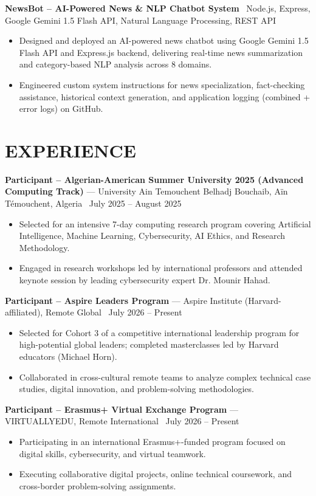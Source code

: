 \documentclass[10.5pt, letterpaper]{article}
\newcommand{\entry}[4]{%
  \noindent\textbf{#1} --- #3, #4 \textbar\ #2\par
  \vspace{2pt}
}
\newcommand{\projectentry}[2]{%
  \noindent\textbf{#1} \textbar\ #2\par
  \vspace{2pt}
}
\newcommand{\resumeItem}[1]{\item #1}
\begin{document}
\projectentry{NewsBot -- AI-Powered News \& NLP Chatbot System}{Node.js, Express, Google Gemini 1.5 Flash API, Natural Language Processing, REST API}
\begin{itemize}
  \resumeItem{Designed and deployed an AI-powered news chatbot using Google Gemini 1.5 Flash API and Express.js backend, delivering real-time news summarization and category-based NLP analysis across 8 domains.}
  \resumeItem{Engineered custom system instructions for news specialization, fact-checking assistance, historical context generation, and application logging (combined + error logs) on GitHub.}
\end{itemize}

\section{EXPERIENCE}

\entry{Participant -- Algerian-American Summer University 2025 (Advanced Computing Track)}{July 2025 -- August 2025}{University Ain Temouchent Belhadj Bouchaib}{Aïn Témouchent, Algeria}
\begin{itemize}
  \resumeItem{Selected for an intensive 7-day computing research program covering Artificial Intelligence, Machine Learning, Cybersecurity, AI Ethics, and Research Methodology.}
  \resumeItem{Engaged in research workshops led by international professors and attended keynote session by leading cybersecurity expert Dr. Mounir Hahad.}
\end{itemize}

\entry{Participant -- Aspire Leaders Program}{July 2026 -- Present}{Aspire Institute (Harvard-affiliated)}{Remote Global}
\begin{itemize}
  \resumeItem{Selected for Cohort 3 of a competitive international leadership program for high-potential global leaders; completed masterclasses led by Harvard educators (Michael Horn).}
  \resumeItem{Collaborated in cross-cultural remote teams to analyze complex technical case studies, digital innovation, and problem-solving methodologies.}
\end{itemize}

\entry{Participant -- Erasmus+ Virtual Exchange Program}{July 2026 -- Present}{VIRTUALLYEDU}{Remote International}
\begin{itemize}
  \resumeItem{Participating in an international Erasmus+-funded program focused on digital skills, cybersecurity, and virtual teamwork.}
  \resumeItem{Executing collaborative digital projects, online technical coursework, and cross-border problem-solving assignments.}
\end{itemize}
\end{document}

